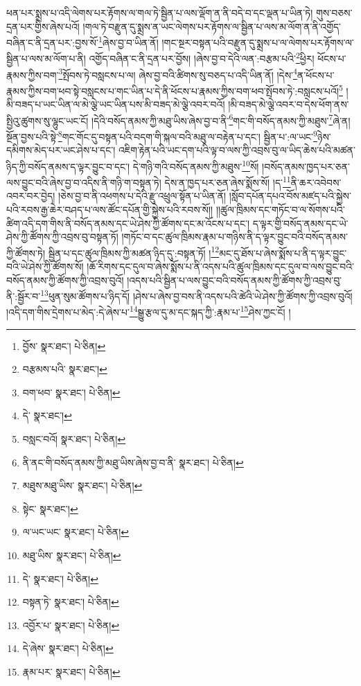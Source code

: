 ཕན་པར་སྨྲས་པ་འདི་ལེགས་པར་རྟོགས་ལ་གལ་ཏེ་སྦྱིན་པ་ལས་ལྡོག་ན་ནི་བདེ་བ་དང་ལྡན་པ་ཡིན་ཏེ། གུས་བཅས་དྲན་པར་གྱིས་ཞེས་པའོ། །གལ་ཏེ་བརྫུན་དུ་སྨྲས་ན་ཡང་ལེགས་པར་རྟོགས་ལ་སྦྱིན་པ་ལས་མ་ལོག་ན་ནི་འགྱོད་བཞིན་ང་ནི་དྲན་པར་:བྱས་སོ་\footnote{བྱོས་  སྣར་ཐང་།  པེ་ཅིན། }ཞེས་བྱ་བ་ཡིན་ནོ། །གང་སྔར་བསྟན་པའི་བརྫུན་དུ་སྨྲས་པ་ལ་ལེགས་པར་རྟོགས་ལ་སྦྱིན་པ་ལས་མ་ལོག་པ་ནི། འགྱོད་བཞིན་ང་ནི་དྲན་པར་བྱོས། །ཞེས་བྱ་བ་དེའི་ལན་:བརྩམ་པའི་\footnote{བརྩམས་པའི་  སྣར་ཐང་། }ཕྱིར། ཕོངས་པ་རྣམས་ཀྱིས་བག་\footnote{བག་ཕབ་  སྣར་ཐང་།  པེ་ཅིན། }སྤོབས་ཏེ་བསླངས་པ་ལ། ཞེས་བྱ་བའི་ཚིགས་སུ་བཅད་པ་འདི་ཡིན་ནོ། །དེས་\footnote{དེ་  སྣར་ཐང་། }ན་ཕོངས་པ་རྣམས་ཀྱིས་བག་ཕབ་སྟེ་བསླངས་པ་གང་ཡིན་པ་དེ་ནི་ཕོངས་པ་རྣམས་ཀྱིས་བག་ཕབ་སྤོབས་ཏེ་:བསླངས་པའོ།\footnote{བསླང་བའོ།  སྣར་ཐང་།  པེ་ཅིན། } །མི་བཟད་པ་ཡང་ཡིན་ལ་མེ་ལྕེ་ཡང་ཡིན་པས་མི་བཟད་མེ་ལྕེ་འབར་བའོ། །མི་བཟད་མེ་ལྕེ་འབར་བ་དེས་ཕོག་ནས་སྤྱིའུ་ཚུགས་སུ་ལྷུང་ཡང་ངོ། །དེའི་བསོད་ནམས་ཀྱི་མཐུ་ཡིས་ཞེས་བྱ་བ་ནི་\footnote{ནི་ནང་གི་བསོད་ནམས་ཀྱི་མཐུ་ཡིས་ཞེས་བྱ་བ་ནི་  སྣར་ཐང་།  པེ་ཅིན། }གང་གི་བསོད་ནམས་ཀྱི་མཐུས་\footnote{མཐུས་མཐུ་ཡིས་  སྣར་ཐང་།  པེ་ཅིན། }ཞེ་ན། སྔོན་བྱས་པའི་སྟེ་\footnote{སྟེང་  སྣར་ཐང་། }གང་གོང་དུ་བསྟན་པའི་བདག་གི་སྐལ་བའི་མཐུ་ལ་བརྟེན་པ་དང་། སྦྱིན་པ་:ལ་ཡང་\footnote{ལ་ཡང་ཡང་  སྣར་ཐང་།  པེ་ཅིན། }ཉེས་དམིགས་མེད་པར་ཡང་ཤེས་པ་དང་། འཇིག་རྟེན་པའི་ཡང་དག་པའི་ལྟ་བ་ལས་ཀྱི་འབྲས་བུ་ལ་ཡིད་ཆེས་པའི་མཚན་ཉིད་ཀྱི་བསོད་ནམས་ད་ལྟར་བྱུང་བ་དང་། དེ་གཉི་གའི་བསོད་ནམས་ཀྱི་མཐུས་\footnote{མཐུ་ཡིས་  སྣར་ཐང་།  པེ་ཅིན། }སོ། །བསོད་ནམས་ཁྱད་པར་ཅན་ལས་བྱུང་བའི་ཞེས་བྱ་བ་འདིས་ནི་གཉི་ག་བསྟན་ཏེ། དེས་ན་ཁྱད་པར་ཅན་ཞེས་སྨོས་སོ། །ད་\footnote{དེ་  སྣར་ཐང་།  པེ་ཅིན། }ནི་ཆར་འབེབས་འབར་བར་བྱེད། །ཅེས་བྱ་བ་ནི་འཕགས་པ་དེའི་རྫུ་འཕྲུལ་སྟོན་པ་ཡིན་ནོ། །སློབ་དཔོན་དཔའ་བོས་མཛད་པའི་སྐྱེས་པའི་རབས་རྒྱ་ཆེར་བཤད་པ་ལས་ཚོང་དཔོན་གྱི་སྐྱེས་པའི་རབས་སོ།། །།ཚུལ་ཁྲིམས་དང་གཏོང་བ་ལ་སོགས་པའི་ཚིག་འདི་དག་གིས་ནི་བསོད་ནམས་དང་ཡེ་ཤེས་ཀྱི་ཚོགས་དང་མ་འོངས་པ་དང་། ད་ལྟར་གྱི་བསོད་ནམས་དང་ཡེ་ཤེས་ཀྱི་ཚོགས་ཀྱི་འབྲས་བུ་བསྟན་ཏོ། །གཏོང་བ་དང་ཚུལ་ཁྲིམས་རྣམ་པ་གཉིས་ནི་ད་ལྟར་བྱུང་བའི་བསོད་ནམས་ཀྱི་ཚོགས་ཏེ། སྦྱིན་པ་དང་ཚུལ་ཁྲིམས་ཀྱི་མཚན་ཉིད་དུ་:བསྟན་ཏོ། །\footnote{བསྟན་ཏེ་  སྣར་ཐང་།  པེ་ཅིན། }མང་དུ་ཐོས་པ་ཞེས་སྨོས་པ་ནི་ད་ལྟར་བྱུང་བའི་ཡེ་ཤེས་ཀྱི་ཚོགས་སོ། །ཆོ་རིགས་དང་དུལ་བ་ཞེས་སྨོས་པ་ནི་འདས་པའི་ཚུལ་ཁྲིམས་དང་དུལ་བ་ལས་བྱུང་བའི་བསོད་ནམས་ཀྱི་ཚོགས་ཀྱི་འབྲས་བུའོ། །འདས་པའི་སྦྱིན་པ་ལས་བྱུང་བའི་བསོད་ནམས་ཀྱི་ཚོགས་ཀྱི་འབྲས་བུ་ནི་:སྦྱོར་བ་\footnote{འབྱོར་པ་  སྣར་ཐང་།  པེ་ཅིན། }ཕུན་སུམ་ཚོགས་པ་ཉིད་དོ། །ཤེས་པ་ཞེས་བྱ་བས་ནི་འདས་པའི་ཚེའི་ཡེ་ཤེས་ཀྱི་ཚོགས་ཀྱི་འབྲས་བུའོ། །འདི་དག་གིས་དྲེགས་པ་མེད་:དེ་ཞེས་པ་\footnote{དེ་ཞེས་  སྣར་ཐང་།  པེ་ཅིན། }སྒྱུ་རྩལ་དུ་མ་དང་སྐད་ཀྱི་:རྣམ་པ་\footnote{རྣམ་པར་  སྣར་ཐང་།  པེ་ཅིན། }ཤེས་ཀྱང་ངོ། །
